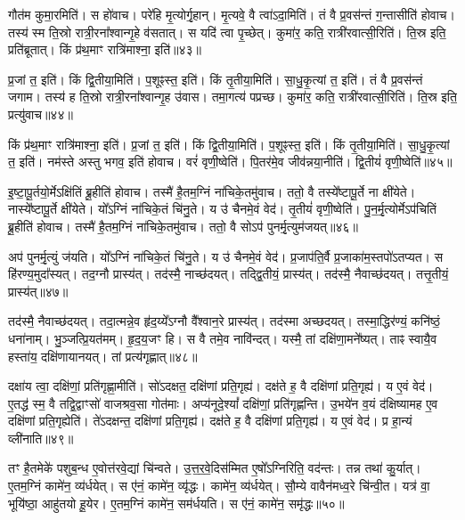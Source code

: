    गौत॑म कुमा॒रमिति॑।
   स हो॑वाच।
   परे॑हि मृ॒त्योर्गृ॒हान्।
   मृ॒त्यवे॒ वै त्वा॑ऽदा॒मिति॑।
   तं वै प्र॒वस॑न्तं ग॒न्तासीति॑ होवाच।
   तस्य॑ स्म ति॒स्रो रात्री॒रना᳚श्वान्गृ॒हे व॑सतात्।
   स यदि॑ त्वा पृ॒च्छेत्।
   कुमा॑र॒ कति॒ रात्री॑रवात्सी॒रिति॑।
   ति॒स्र इति॒ प्रति॑ब्रूतात्।
   किं प्र॑थ॒माꣳ रात्रि॑माश्ना॒ इति॑॥४३॥

   प्र॒जां त॒ इति॑।
   किं द्वि॒तीया॒मिति॑।
   प॒शूꣴस्त॒ इति॑।
   किं तृ॒तीया॒मिति॑।
   सा॒धु॒कृ॒त्यां त॒ इति॑।
   तं वै प्र॒वस॑न्तं जगाम।
   तस्य॑ ह ति॒स्रो रात्री॒रना᳚श्वान्गृ॒ह उ॑वास।
   तमा॒गत्य॑ पप्रच्छ।
   कुमा॑र॒ कति॒ रात्री॑रवात्सी॒रिति॑।
   ति॒स्र इति॒ प्रत्यु॑वाच॥४४॥

   किं प्र॑थ॒माꣳ रात्रि॑माश्ना॒ इति॑।
   प्र॒जां त॒ इति॑।
   किं द्वि॒तीया॒मिति॑।
   प॒शूꣴस्त॒ इति॑।
   किं तृ॒तीया॒मिति॑।
   सा॒धु॒कृ॒त्यां त॒ इति॑।
   नम॑स्ते अस्तु भगव॒ इति॑ होवाच।
   वरं॑ वृणी॒ष्वेति॑।
   पि॒तर॑मे॒व जीव॑न्नया॒नीति॑।
   द्वि॒तीयं॑ वृणी॒ष्वेति॑॥४५॥

   इ॒ष्टा॒पू॒र्तयो॒र्मेऽक्षि॑तिं ब्रू॒हीति॑ होवाच।
   तस्मै॑ है॒तम॒ग्निं ना॑चिके॒तमु॑वाच।
   ततो॒ वै तस्ये᳚ष्टापू॒र्ते ना क्षी॑येते।
   नास्ये᳚ष्टापू॒र्ते क्षी॑येते।
   यो᳚ऽग्निं ना॑चिके॒तं चि॑नु॒ते।
   य उ॑ चैनमे॒वं वेद॑।
   तृ॒तीयं॑ वृणी॒ष्वेति॑।
   पु॒न॒र्मृ॒त्योर्मेऽप॑चितिं ब्रू॒हीति॑ होवाच।
   तस्मै॑ है॒तम॒ग्निं ना॑चिके॒तमु॑वाच।
   ततो॒ वै सोऽप॑ पुनर्मृ॒त्युम॑जयत्॥४६॥

   अप॑ पुनर्मृ॒त्युं ज॑यति।
   यो᳚ऽग्निं ना॑चिके॒तं चि॑नु॒ते।
   य उ॑ चैनमे॒वं वेद॑।
   प्र॒जाप॑ति॒र्वै प्र॒जाका॑म॒स्तपो॑ऽतप्यत।
   स हि॑रण्य॒मुदा᳚स्यत्।
   तद॒ग्नौ प्रास्य॑त्।
   तद॑स्मै॒ नाच्छ॑दयत्।
   तद्द्वि॒तीयं॒ प्रास्य॑त्।
   तद॑स्मै॒ नैवाच्छ॑दयत्।
   तत्तृ॒तीयं॒ प्रास्य॑त्॥४७॥

   तद॑स्मै॒ नैवाच्छ॑दयत्।
   तदा॒त्मन्ने॒व हृ॑द॒य्ये᳚ऽग्नौ वै᳚श्वान॒रे प्रास्य॑त्।
   तद॑स्मा अच्छदयत्।
   तस्मा॒द्धिर॑ण्यं॒ कनि॑ष्ठं॒ धना॑नाम्।
   भु॒ञ्जत्प्रि॒यत॑मम्।
   हृ॒द॒य॒जꣳ हि।
   स वै तमे॒व नावि॑न्दत्।
   यस्मै॒ तां दक्षि॑णा॒मने᳚ष्यत्।
   ताꣴ स्वायै॒व हस्ता॑य॒ दक्षि॑णायानयत्।
   तां प्रत्य॑गृह्णात्॥४८॥

   दक्षा॑य त्वा॒ दक्षि॑णां॒ प्रति॑गृह्णा॒मीति॑।
   सो॑ऽदक्षत॒ दक्षि॑णां प्रति॒गृह्य॑।
   दक्ष॑ते ह॒ वै दक्षि॑णां प्रति॒गृह्य॑।
   य ए॒वं वेद॑।
   ए॒तद्ध॑ स्म॒ वै तद्वि॒द्वाꣳसो॑ वाजश्रव॒सा गोत॑माः।
   अप्य॑नूदे॒श्यां᳚ दक्षि॑णां॒ प्रति॑गृह्णन्ति।
   उ॒भये॑न व॒यं द॑क्षिष्यामह ए॒व दक्षि॑णां प्रति॒गृह्येति॑।
   ते॑ऽदक्षन्त॒ दक्षि॑णां प्रति॒गृह्य॑।
   दक्ष॑ते ह॒ वै दक्षि॑णां प्रति॒गृह्य॑।
   य ए॒वं वेद॑।
   प्र  हा॒न्यं व्ली॑नाति॥४९॥
   \anuvakamend
  
   तꣳ है॒तमेके॑ पशुब॒न्ध ए॒वोत्त॑रवे॒द्यां चि॑न्वते।
   उ॒त्त॒र॒वे॒दिस॑म्मित ए॒षो᳚ऽग्निरिति॒ वद॑न्तः।
   तन्न तथा॑ कु॒र्यात्।
   ए॒तम॒ग्निं कामे॑न॒ व्य॑र्धयेत्।
   स ए॑नं॒ कामे॑न॒ व्यृ॑द्धः।
   कामे॑न॒ व्य॑र्धयेत्।
   सौ॒म्ये वावैन॑मध्व॒रे चि॑न्वी॒त।
   यत्र॑ वा॒ भूयि॑ष्ठा॒ आहु॑तयो हू॒येर\sn{}।
   ए॒तम॒ग्निं कामे॑न॒ सम॑र्धयति।
   स ए॑नं॒ कामे॑न॒ समृ॑द्धः॥५०॥

